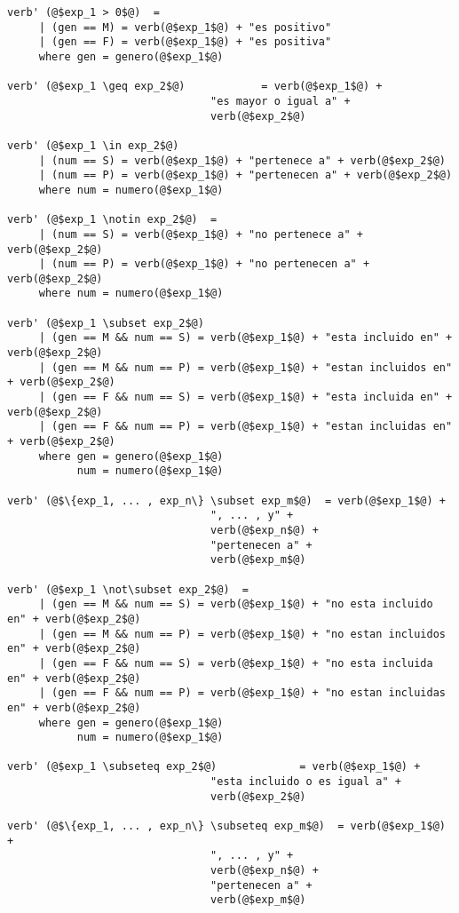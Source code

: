 \begin{verbatim}
verb' (@$exp_1 > 0$@)  =
     | (gen == M) = verb(@$exp_1$@) + "es positivo" 
     | (gen == F) = verb(@$exp_1$@) + "es positiva" 
     where gen = genero(@$exp_1$@)

verb' (@$exp_1 \geq exp_2$@)            = verb(@$exp_1$@) +  
                                "es mayor o igual a" +  
                                verb(@$exp_2$@) 

verb' (@$exp_1 \in exp_2$@)
     | (num == S) = verb(@$exp_1$@) + "pertenece a" + verb(@$exp_2$@) 
     | (num == P) = verb(@$exp_1$@) + "pertenecen a" + verb(@$exp_2$@) 
     where num = numero(@$exp_1$@)

verb' (@$exp_1 \notin exp_2$@)  = 
     | (num == S) = verb(@$exp_1$@) + "no pertenece a" + verb(@$exp_2$@) 
     | (num == P) = verb(@$exp_1$@) + "no pertenecen a" + verb(@$exp_2$@) 
     where num = numero(@$exp_1$@)

verb' (@$exp_1 \subset exp_2$@)
     | (gen == M && num == S) = verb(@$exp_1$@) + "esta incluido en" + verb(@$exp_2$@) 
     | (gen == M && num == P) = verb(@$exp_1$@) + "estan incluidos en" + verb(@$exp_2$@) 
     | (gen == F && num == S) = verb(@$exp_1$@) + "esta incluida en" + verb(@$exp_2$@) 
     | (gen == F && num == P) = verb(@$exp_1$@) + "estan incluidas en" + verb(@$exp_2$@) 
     where gen = genero(@$exp_1$@)
           num = numero(@$exp_1$@)

verb' (@$\{exp_1, ... , exp_n\} \subset exp_m$@)  = verb(@$exp_1$@) +  
                                ", ... , y" +  
                                verb(@$exp_n$@) +  
                                "pertenecen a" +
                                verb(@$exp_m$@)

verb' (@$exp_1 \not\subset exp_2$@)  = 
     | (gen == M && num == S) = verb(@$exp_1$@) + "no esta incluido en" + verb(@$exp_2$@) 
     | (gen == M && num == P) = verb(@$exp_1$@) + "no estan incluidos en" + verb(@$exp_2$@) 
     | (gen == F && num == S) = verb(@$exp_1$@) + "no esta incluida en" + verb(@$exp_2$@) 
     | (gen == F && num == P) = verb(@$exp_1$@) + "no estan incluidas en" + verb(@$exp_2$@) 
     where gen = genero(@$exp_1$@)
           num = numero(@$exp_1$@)

verb' (@$exp_1 \subseteq exp_2$@)             = verb(@$exp_1$@) +  
                                "esta incluido o es igual a" +  
                                verb(@$exp_2$@) 

verb' (@$\{exp_1, ... , exp_n\} \subseteq exp_m$@)  = verb(@$exp_1$@) +  
                                ", ... , y" +  
                                verb(@$exp_n$@) +  
                                "pertenecen a" +
                                verb(@$exp_m$@)


\end{verbatim}
